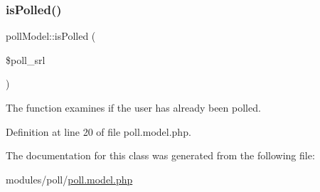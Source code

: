 \subsubsection{\texorpdfstring{is\+Polled()}{isPolled()}}
{\footnotesize\ttfamily poll\+Model\+::is\+Polled (\begin{DoxyParamCaption}\item[{}]{\$poll\+\_\+srl }\end{DoxyParamCaption})}



The function examines if the user has already been polled. 



Definition at line 20 of file poll.\+model.\+php.



The documentation for this class was generated from the following file\+:\begin{DoxyCompactItemize}
\item 
modules/poll/\hyperlink{poll_8model_8php}{poll.\+model.\+php}\end{DoxyCompactItemize}
